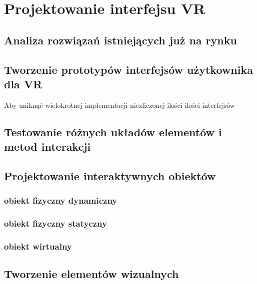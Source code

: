 \chapter{Projektowanie interfejsu VR}


\section{Analiza rozwiązań istniejących już na rynku}

\section{Tworzenie prototypów interfejsów użytkownika dla VR}
Aby uniknąć wielokrotnej implementacji niezliczonej ilości ilości interfejsów 
\section{Testowanie różnych układów elementów i metod interakcji}
\section{Projektowanie interaktywnych obiektów}
\subsection{obiekt fizyczny dynamiczny}
\subsection{obiekt fizyczny statyczny}
\subsection{obiekt wirtualny}
\section{Tworzenie elementów wizualnych}


